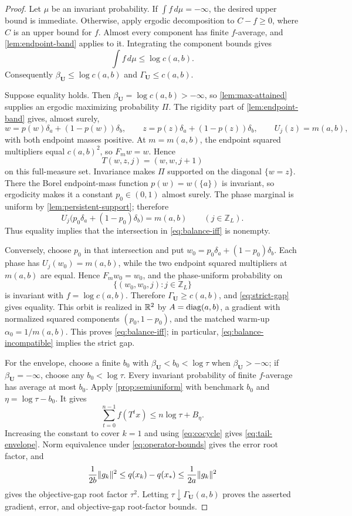 \documentclass[letterpaper,twoside]{article}
\begin{document}
\begin{proof}
Let $\mu$ be an invariant probability.  If $\int f\,d\mu=-\infty$, the
desired upper bound is immediate.  Otherwise, apply ergodic decomposition to
$C-f\ge0$, where $C$ is an upper bound for $f$.  Almost every component has
finite $f$-average, and \cref{lem:endpoint-band} applies to it.  Integrating
the component bounds gives
\[
 \int f\,d\mu\le\log c(a,b).
\]
Consequently $\beta_{\bm U}\le\log c(a,b)$ and
$\Gamma_{\bm U}\le c(a,b)$.

 Suppose equality holds.  Then $\beta_{\bm U}=\log c(a,b)>-\infty$, so
\cref{lem:max-attained} supplies an ergodic maximizing probability $\Pi$.
The rigidity part of \cref{lem:endpoint-band} gives, almost surely,
\[
 w=p(w)\delta_a+(1-p(w))\delta_b,
 \qquad
 z=p(z)\delta_a+(1-p(z))\delta_b,
 \qquad
 U_j(z)=m(a,b),
\]
with both endpoint masses positive.  At $m=m(a,b)$, the endpoint squared
multipliers equal $c(a,b)^2$, so $F_m w=w$.  Hence
\[
 T(w,z,j)=(w,w,j+1)
\]
on this full-measure set.  Invariance makes $\Pi$ supported on the diagonal
$\{w=z\}$.  There the Borel endpoint-mass function $p(w)=w(\{a\})$ is
invariant, so ergodicity makes it a constant $p_0\in(0,1)$ almost surely.
The phase marginal is uniform by \cref{lem:persistent-support}; therefore
\[
 U_j\bigl(p_0\delta_a+(1-p_0)\delta_b\bigr)=m(a,b)
 \qquad(j\in\mathbb Z_L).
\]
 Thus equality implies that the intersection in \eqref{eq:balance-iff} is
nonempty.

Conversely, choose $p_0$ in that intersection and put
$w_0=p_0\delta_a+(1-p_0)\delta_b$.  Each phase has
$U_j(w_0)=m(a,b)$, while the two endpoint squared multipliers at $m(a,b)$
are equal.  Hence $F_mw_0=w_0$, and the phase-uniform probability on
\[
 \{(w_0,w_0,j):j\in\mathbb Z_L\}
\]
is invariant with $f=\log c(a,b)$.  Therefore
$\Gamma_{\bm U}\ge c(a,b)$, and \eqref{eq:strict-gap} gives equality.
This orbit is realized in $\mathbb R^2$ by
$A=\operatorname{diag}(a,b)$, a gradient with normalized squared components
$(p_0,1-p_0)$, and the matched warm-up $\alpha_0=1/m(a,b)$.  This proves
\eqref{eq:balance-iff}; in particular, \eqref{eq:balance-incompatible}
implies the strict gap.

For the envelope, choose a finite $b_0$ with
$\beta_{\bm U}<b_0<\log\tau$ when $\beta_{\bm U}>-\infty$; if
$\beta_{\bm U}=-\infty$, choose any $b_0<\log\tau$.  Every invariant
probability of finite $f$-average has average at most $b_0$.  Apply
\cref{prop:semiuniform} with benchmark $b_0$ and
$\eta=\log\tau-b_0$.  It gives
\[
 \sum_{t=0}^{n-1}f(T^tx)
 \le n\log\tau+B_\eta.
\]
Increasing the constant to cover $k=1$ and using \eqref{eq:cocycle} gives
\eqref{eq:tail-envelope}.  Norm equivalence under
\eqref{eq:operator-bounds} gives the error root factor, and
\[
 \frac1{2b}\lVert g_k\rVert^2
 \le q(x_k)-q(x_*)
 \le\frac1{2a}\lVert g_k\rVert^2
\]
gives the objective-gap root factor $\tau^2$.
Letting $\tau\downarrow\Gamma_{\bm U}(a,b)$ proves the asserted gradient,
error, and objective-gap root-factor bounds.
\end{proof}
\end{document}
